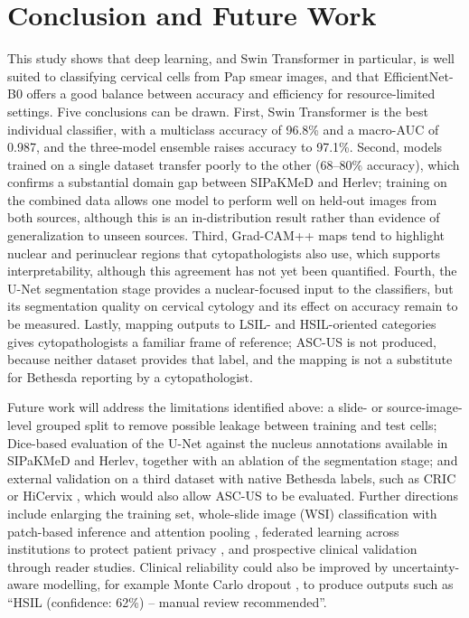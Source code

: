 \documentclass[conference]{IEEEtran}
\begin{document}
\section{Conclusion and Future Work}
\label{sec:conclusion}

This study shows that deep learning, and Swin Transformer in particular, is well suited to classifying cervical cells from Pap smear images, and that EfficientNet-B0 offers a good balance between accuracy and efficiency for resource-limited settings. Five conclusions can be drawn. First, Swin Transformer is the best individual classifier, with a multiclass accuracy of 96.8\% and a macro-AUC of 0.987, and the three-model ensemble raises accuracy to 97.1\%. Second, models trained on a single dataset transfer poorly to the other (68--80\% accuracy), which confirms a substantial domain gap between SIPaKMeD and Herlev; training on the combined data allows one model to perform well on held-out images from both sources, although this is an in-distribution result rather than evidence of generalization to unseen sources. Third, Grad-CAM++ maps tend to highlight nuclear and perinuclear regions that cytopathologists also use, which supports interpretability, although this agreement has not yet been quantified. Fourth, the U-Net segmentation stage provides a nuclear-focused input to the classifiers, but its segmentation quality on cervical cytology and its effect on accuracy remain to be measured. Lastly, mapping outputs to LSIL- and HSIL-oriented categories gives cytopathologists a familiar frame of reference; ASC-US is not produced, because neither dataset provides that label, and the mapping is not a substitute for Bethesda reporting by a cytopathologist.

Future work will address the limitations identified above: a slide- or source-image-level grouped split to remove possible leakage between training and test cells; Dice-based evaluation of the U-Net against the nucleus annotations available in SIPaKMeD and Herlev, together with an ablation of the segmentation stage; and external validation on a third dataset with native Bethesda labels, such as CRIC \cite{rezende2021cric} or HiCervix \cite{cai2024hicervix}, which would also allow ASC-US to be evaluated. Further directions include enlarging the training set, whole-slide image (WSI) classification \cite{dang2023wsi} with patch-based inference and attention pooling \cite{ilse2018attention}, federated learning across institutions to protect patient privacy \cite{rieke2020federated}, and prospective clinical validation through reader studies. Clinical reliability could also be improved by uncertainty-aware modelling, for example Monte Carlo dropout \cite{gal2016dropout}, to produce outputs such as ``HSIL (confidence: 62\%) -- manual review recommended''.
\end{document}
